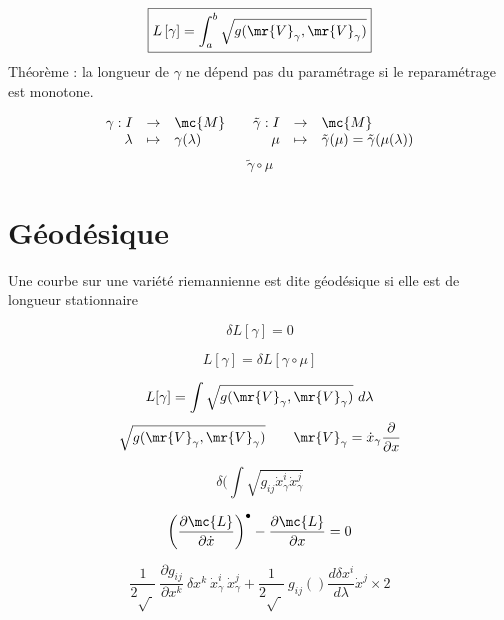 \[
\boxed{L\,[\gamma]=\int_a^b \sqrt{g(\mr{V}_\gamma,\mr{V}_\gamma)}}
\]
Théorème : la longueur de $\gamma$ ne dépend pas du paramétrage si le reparamétrage est monotone.

\[
\begin{array}{ r c l }
 \gamma : I & \to & \mc{M} \\ \lambda & \mapsto & \gamma(\lambda) \\
\end{array}
\quad
\begin{array}{ r c l }
 \tilde{\gamma} : I & \to & \mc{M} \\
 \mu & \mapsto & \tilde{\gamma}(\mu)=\tilde{\gamma}(\mu(\lambda)) \\
\end{array}
\]
\[
\tilde{\gamma}\circ\mu
\]

\section{Géodésique}%
Une courbe sur une variété riemannienne est dite géodésique si elle est de longueur stationnaire

\begin{minipage}[c]{.45\linewidth}
\[
\delta L[\gamma]=0
\]
\end{minipage}
\hfill
\begin{minipage}[c]{.45\linewidth}
\[
L[\gamma]=\delta L[\gamma\circ\mu]
\]
\end{minipage}
\[
L[\gamma]=\int\sqrt{g(\mr{V}_\gamma,\mr{V}_\gamma)}\ d\lambda
\]
\[
\sqrt{g(\mr{V}_\gamma,\mr{V}_\gamma)} \qquad
\mr{V}_\gamma =  \dot{x}_\gamma\frac{\partial}{\partial x}
\]

\begin{minipage}[c]{.45\linewidth}
\[
\delta (\int \sqrt{g_{ij}\dot{x}_\gamma^i \dot{x}_\gamma^j}
\]
\end{minipage}
\hfill
\begin{minipage}[c]{.45\linewidth}
\[
\left(\frac{\partial \mc{L}}{\partial \dot{x}}\right)^\bullet
-\frac{\partial\mc{L}}{\partial x}=0
\]
\end{minipage}

\[
\frac{1}{2\sqrt{\ }}\ \frac{\partial g_{ij}}{\partial x^k}\ \delta x^k
\ \dot{x}_\gamma^i\ \dot{x}_\gamma^j
+\frac{1}{2\sqrt{\ }}\ g_{ij}() \frac{d\delta x^i}{d\lambda} \dot{x}^j \times 2
\]

